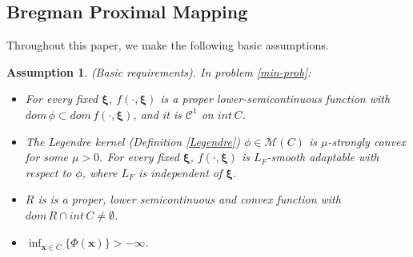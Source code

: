 \documentclass[twoside,11pt]{article}
\newcommand{\cC}{\mathcal C}
\newcommand{\cD}{\mathcal D}
\newcommand{\cM}{\mathcal M}
\def\inprod#1#2{\langle#1,\,#2\rangle}
\newtheorem{assumption}{Assumption}%
\def\vg{{\bm{g}}}
\def\vu{{\bm{u}}}
\def\vx{{\bm{x}}}
\def\vy{{\bm{y}}}
\begin{document}
\subsection{Bregman Proximal Mapping}\label{subsec-Bregman-Proximal-mapping}
Throughout this paper, we make the following basic assumptions.
\begin{assumption}\label{relative-smooth-assumption}
(Basic requirements). In problem \eqref{min-prob}:
\begin{itemize}
 \item[A1.] For {every} fixed $\bm\xi$, $f(\cdot,\bm\xi)$ is a proper lower-semicontinuous function with $dom\,\phi\subset dom\,f(\cdot,\bm\xi)$, {and it} is $\cC^1$ on $int\,C$.
 \item[A2.] The Legendre kernel (Definition \ref{Legendre}) $\phi\in\cM(C)$ is $\mu$-strongly convex {for some} $\mu>0$.  For every fixed ${\bm\xi}$, $f(\cdot,\bm\xi)$ is $L_F$-smooth adaptable with respect to $\phi$, {where $L_F$ is independent of $\bm\xi$.} 
 \item[A3.] $R$ is is a proper, lower semicontinuous and convex function with $dom\,R\cap int\,C\neq\emptyset$.
 \item[A4.] $\inf_{\vx\in\overline{C}}\{\Phi(\vx)\}>-\infty$.  %
\end{itemize}
\end{assumption}
\end{document}
